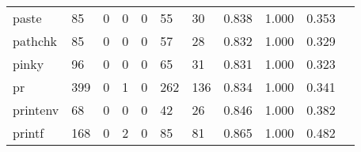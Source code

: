 \begin{longtable}{lp{1.2cm}p{1.2cm}p{1.2cm}p{1.2cm}p{1.2cm}p{1.2cm}p{1.2cm}p{1.2cm}p{1.2cm}p{1.2cm}}
paste     &                                    85 &                                                  0 &                                                  0 &                                                  0 &                                                 55 &                                                 30 &                                         0.838 &                                              1.000 &                                              0.353 \\
pathchk   &                                    85 &                                                  0 &                                                  0 &                                                  0 &                                                 57 &                                                 28 &                                         0.832 &                                              1.000 &                                              0.329 \\
pinky     &                                    96 &                                                  0 &                                                  0 &                                                  0 &                                                 65 &                                                 31 &                                         0.831 &                                              1.000 &                                              0.323 \\
pr        &                                   399 &                                                  0 &                                                  1 &                                                  0 &                                                262 &                                                136 &                                         0.834 &                                              1.000 &                                              0.341 \\
printenv  &                                    68 &                                                  0 &                                                  0 &                                                  0 &                                                 42 &                                                 26 &                                         0.846 &                                              1.000 &                                              0.382 \\
printf    &                                   168 &                                                  0 &                                                  2 &                                                  0 &                                                 85 &                                                 81 &                                         0.865 &                                              1.000 &                                              0.482 \\

\end{longtable}
